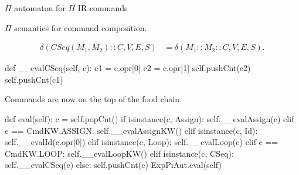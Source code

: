 \documentclass{beamer}
\begin{document}
\begin{frame}{{\color{red}$\Pi$ automaton} for {\color{red}$\Pi$ IR} commands}
\framebreak

{\color{red}$\Pi$}  semantics for command composition.

\begin{scriptsize}
\begin{align}
\delta(CSeq(M_1, M_2) :: C, V, E, S) & = \delta(M_1 :: M_2 :: C, V, E, S). \nonumber
\end{align}
\end{scriptsize}

\begin{python}
    def __evalCSeq(self, c):
        c1 = c.opr[0]
        c2 = c.opr[1]
        self.pushCnt(c2)
        self.pushCnt(c1)
\end{python}

\framebreak

Commands are now on the top of the food chain.

\begin{python}
    def eval(self): 
        c = self.popCnt()
        if isinstance(c, Assign):
            self.__evalAssign(c)
        elif c == CmdKW.ASSIGN:
            self.__evalAssignKW()
        elif isinstance(c, Id):
            self.__evalId(c.opr[0])
        elif isinstance(c, Loop):
            self.__evalLoop(c)
        elif c == CmdKW.LOOP:
            self.__evalLoopKW()
        elif isinstance(c, CSeq):
            self.__evalCSeq(c)
        else:
            self.pushCnt(c)
            ExpPiAut.eval(self)
\end{python}
\end{frame}

\end{document}
